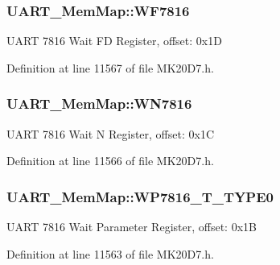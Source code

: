 \subsubsection[{\texorpdfstring{W\+F7816}{WF7816}}]{ U\+A\+R\+T\+\_\+\+Mem\+Map\+::\+W\+F7816}\hypertarget{struct_u_a_r_t___mem_map_afd05a5c4ba0ae69c16ca9b6cd578a726}{}\label{struct_u_a_r_t___mem_map_afd05a5c4ba0ae69c16ca9b6cd578a726}
U\+A\+RT 7816 Wait FD Register, offset\+: 0x1D 

Definition at line 11567 of file M\+K20\+D7.\+h.

\subsubsection[{\texorpdfstring{W\+N7816}{WN7816}}]{ U\+A\+R\+T\+\_\+\+Mem\+Map\+::\+W\+N7816}\hypertarget{struct_u_a_r_t___mem_map_aed09f864d4f1afe57f146ff72949c3d2}{}\label{struct_u_a_r_t___mem_map_aed09f864d4f1afe57f146ff72949c3d2}
U\+A\+RT 7816 Wait N Register, offset\+: 0x1C 

Definition at line 11566 of file M\+K20\+D7.\+h.

\subsubsection[{\texorpdfstring{W\+P7816\+\_\+\+T\+\_\+\+T\+Y\+P\+E0}{WP7816_T_TYPE0}}]{ U\+A\+R\+T\+\_\+\+Mem\+Map\+::\+W\+P7816\+\_\+\+T\+\_\+\+T\+Y\+P\+E0}\hypertarget{struct_u_a_r_t___mem_map_a5a6da05123820fc86d6f01d9d2464156}{}\label{struct_u_a_r_t___mem_map_a5a6da05123820fc86d6f01d9d2464156}
U\+A\+RT 7816 Wait Parameter Register, offset\+: 0x1B 

Definition at line 11563 of file M\+K20\+D7.\+h.


